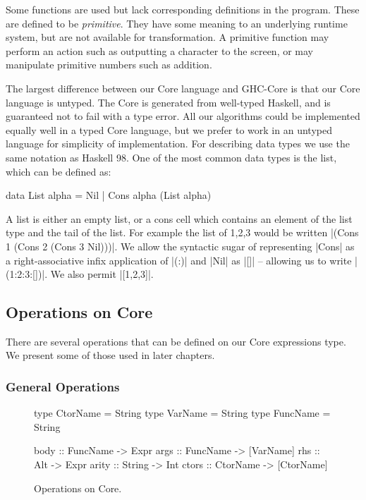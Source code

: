 Some functions are used but lack corresponding definitions in the program. These are defined to be \textit{primitive}. They have some meaning to an underlying runtime system, but are not available for transformation. A primitive function may perform an action such as outputting a character to the screen, or may manipulate primitive numbers such as addition.

The largest difference between our Core language and GHC-Core \cite{ghc_core} is that our Core language is untyped. The Core is generated from well-typed Haskell, and is guaranteed not to fail with a type error. All our algorithms could be implemented equally well in a typed Core language, but we prefer to work in an untyped language for simplicity of implementation. For describing data types we use the same notation as Haskell 98. One of the most common data types is the list, which can be defined as:

\begin{code}
data List alpha = Nil | Cons alpha (List alpha)
\end{code}

A list is either an empty list, or a cons cell which contains an element of the list type and the tail of the list. For example the list of 1,2,3 would be written |(Cons 1 (Cons 2 (Cons 3 Nil)))|. We allow the syntactic sugar of representing |Cons| as a right-associative infix application of |(:)| and |Nil| as |[]| -- allowing us to write |(1:2:3:[])|. We also permit |[1,2,3]|.


\subsection{Operations on Core}

There are several operations that can be defined on our Core expressions type. We present some of those used in later chapters.

\subsubsection{General Operations}

\begin{figure}
\begin{code}
type CtorName  = String
type VarName   = String
type FuncName  = String

body   :: FuncName  -> Expr
args   :: FuncName  -> [VarName]
rhs    :: Alt       -> Expr
arity  :: String    -> Int
ctors  :: CtorName  -> [CtorName]
\end{code}
\caption{Operations on Core.}
\label{figB:core_operations}
\end{figure}

